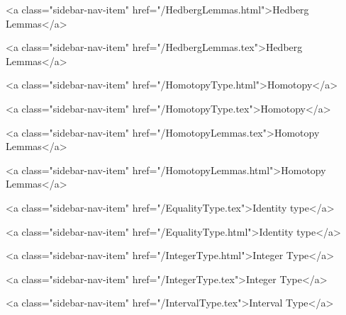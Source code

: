       
    
      
        
          <a class="sidebar-nav-item" href="/HedbergLemmas.html">Hedberg Lemmas</a>
        
      
    
      
        
          <a class="sidebar-nav-item" href="/HedbergLemmas.tex">Hedberg Lemmas</a>
        
      
    
      
        
          <a class="sidebar-nav-item" href="/HomotopyType.html">Homotopy</a>
        
      
    
      
        
          <a class="sidebar-nav-item" href="/HomotopyType.tex">Homotopy</a>
        
      
    
      
        
          <a class="sidebar-nav-item" href="/HomotopyLemmas.tex">Homotopy Lemmas</a>
        
      
    
      
        
          <a class="sidebar-nav-item" href="/HomotopyLemmas.html">Homotopy Lemmas</a>
        
      
    
      
        
          <a class="sidebar-nav-item" href="/EqualityType.tex">Identity type</a>
        
      
    
      
        
          <a class="sidebar-nav-item" href="/EqualityType.html">Identity type</a>
        
      
    
      
        
          <a class="sidebar-nav-item" href="/IntegerType.html">Integer Type</a>
        
      
    
      
        
          <a class="sidebar-nav-item" href="/IntegerType.tex">Integer Type</a>
        
      
    
      
        
          <a class="sidebar-nav-item" href="/IntervalType.tex">Interval Type</a>
        
